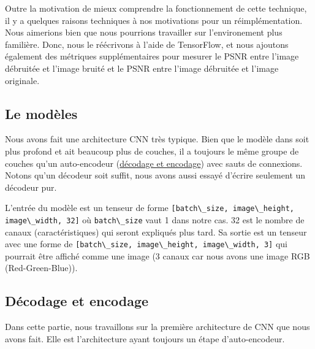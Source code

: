 \documentclass[
  11pt,
  dvipsnames]{article}
\newcommand{\passthrough}[1]{#1}
\begin{document}
Outre la motivation de mieux comprendre la fonctionnement de cette technique, il y a quelques raisons techniques à nos motivations pour un réimplémentation. Nous aimerions bien que nous pourrions travailler sur l'environement plus familière. Donc, nous le réécrivons à l'aide de TensorFlow, et nous ajoutons également
des métriques supplémentaires pour mesurer le PSNR entre l'image
débruitée et l'image bruité et le PSNR entre l'image débruitée et l'image originale.

\hypertarget{le-moduxe8les}{%
\subsection{Le modèles}\label{le-moduxe8les}}

Nous avons fait une architecture CNN très typique. Bien que le modèle dans \autocite{1711.10925}
soit plus profond et ait beaucoup plus de couches, il a toujours le même groupe de couches
qu'un auto-encodeur (\protect\hyperlink{duxe9codage-et-encodage}{décodage et encodage}) avec sauts de connexions. Notons qu'un décodeur soit suffit, nous avons aussi essayé d'écrire seulement un décodeur pur.

L'entrée du modèle est un tenseur de forme \passthrough{\lstinline![batch\_size, image\_height, image\_width, 32]!} où \passthrough{\lstinline!batch\_size!} vaut 1 dans notre cas. 32 est le nombre de canaux (caractéristiques) qui seront expliqués plus tard. Sa sortie est un tenseur avec une forme de \passthrough{\lstinline![batch\_size, image\_height, image\_width, 3]!} qui pourrait être affiché comme une image (3 canaux car nous avons une image RGB (Red-Green-Blue)).

\hypertarget{duxe9codage-et-encodage}{%
\subsection{Décodage et encodage}\label{duxe9codage-et-encodage}}

Dans cette partie, nous travaillons sur la première architecture de CNN que nous avons fait.
Elle est l'architecture ayant toujours un étape d'auto-encodeur.
\end{document}
